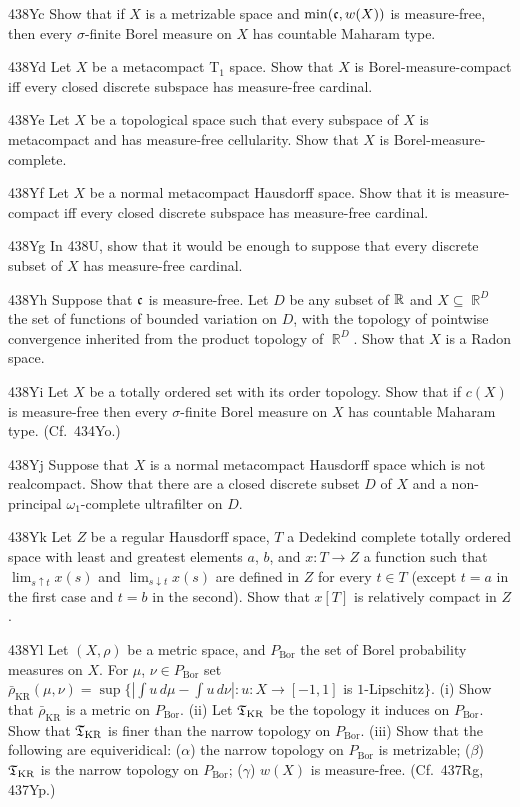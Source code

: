 {\spheader 438Yc Show that if $X$ is a metrizable space and
$\min(\frak c,w(X))$ is measure-free, then every $\sigma$-finite
Borel measure on $X$ has countable Maharam type.

\spheader 438Yd Let $X$ be a metacompact T$_1$ space.   Show that $X$ is
Borel-measure-compact iff every closed discrete
subspace has measure-free cardinal.

\spheader 438Ye Let $X$ be a topological space such that every subspace
of $X$ is metacompact and has measure-free cellularity.   Show that
$X$ is Borel-measure-complete.

\spheader 438Yf Let $X$ be a normal metacompact Hausdorff space.   Show
that it is measure-compact iff every closed discrete subspace has
measure-free cardinal.

\spheader 438Yg In 438U, show that it would be enough to suppose that
every discrete subset of $X$ has measure-free cardinal.

\spheader 438Yh Suppose that $\frak c$ is measure-free.   Let $D$ be
any subset of $\Bbb R$ and $X\subseteq\BbbR^D$ the set of functions of
bounded variation on $D$, with the topology of pointwise convergence
inherited from the
product topology of $\BbbR^D$.   Show that $X$ is a Radon space.

\spheader 438Yi Let $X$ be a totally ordered set with its order
topology.   Show that if $c(X)$ is measure-free then every
$\sigma$-finite Borel measure on $X$ has countable Maharam type.
(Cf.\ 434Yo.)

\spheader 438Yj Suppose that $X$ is a normal metacompact Hausdorff space
which is not realcompact.   Show that there are a closed discrete subset
$D$ of $X$ and a non-principal $\omega_1$-complete ultrafilter on $D$.

\spheader 438Yk Let $Z$ be a regular
Hausdorff space, $T$ a Dedekind complete totally
ordered space with least and greatest elements $a$, $b$,
and $x:T\to Z$ a function such that
$\lim_{s\uparrow t}x(s)$ and $\lim_{s\downarrow t}x(s)$ are defined in
$Z$ for every $t\in T$ (except $t=a$ in the first case and $t=b$ in the
second).   Show that $x[T]$ is relatively compact in $Z$.

\spheader 438Yl Let $(X,\rho)$ be a metric space, and
$P_{\text{Bor}}$ the set of Borel probability measures on $X$.
For $\mu$, $\nu\in P_{\text{Bor}}$ set
$\bar\rho_{\text{KR}}(\mu,\nu)
=\sup\{|\int u\,d\mu-\int u\,d\nu|:u:X\to[-1,1]$ is $1$-Lipschitz$\}$.
(i) Show that $\bar\rho_{\text{KR}}$ is a metric on
$P_{\text{Bor}}$.   (ii) Let $\frak T_{\text{KR}}$ be the topology it
induces on $P_{\text{Bor}}$.   Show that $\frak T_{\text{KR}}$ is finer
than the narrow topology on $P_{\text{Bor}}$.   (iii) Show that the
following are equiveridical:  ($\alpha$) the narrow topology on
$P_{\text{Bor}}$ is metrizable;  ($\beta$) $\frak T_{\text{KR}}$ is the
narrow topology on $P_{\text{Bor}}$;  ($\gamma$) $w(X)$ is measure-free.
(Cf.\ 437Rg, 437Yp.)
}%

